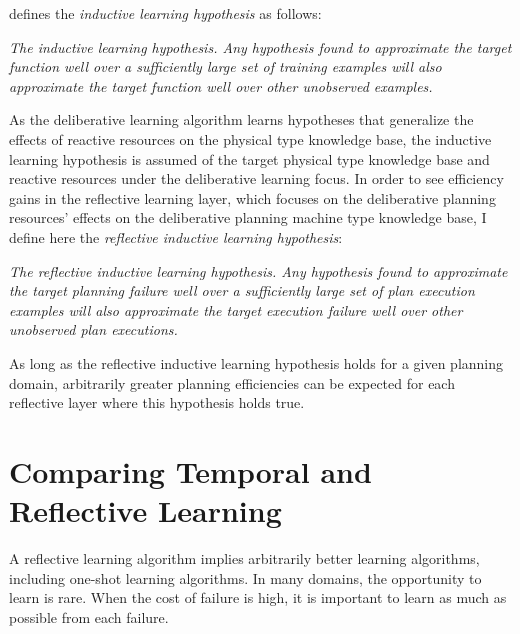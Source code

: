 \cite{mitchell:1997} defines the \emph{inductive learning hypothesis}
as follows:
\begin{definition}\emph{
\emph{The inductive learning hypothesis.} Any hypothesis found to
approximate the target function well over a sufficiently large set of
training examples will also approximate the target function well over
other unobserved examples.  }\end{definition} \noindent As the
deliberative learning algorithm learns hypotheses that generalize the
effects of reactive resources on the physical type knowledge base, the
inductive learning hypothesis is assumed of the target physical type
knowledge base and reactive resources under the deliberative learning
focus.  In order to see efficiency gains in the reflective learning
layer, which focuses on the deliberative planning resources' effects
on the deliberative planning machine type knowledge base, I define
here the \emph{reflective inductive learning hypothesis}:
\begin{definition}\emph{
\emph{The reflective inductive learning hypothesis.} Any hypothesis
found to approximate the target planning failure well over a
sufficiently large set of plan execution examples will also
approximate the target execution failure well over other unobserved
plan executions.}\end{definition} As long as the reflective inductive
learning hypothesis holds for a given planning domain, arbitrarily
greater planning efficiencies can be expected for each reflective
layer where this hypothesis holds true.

\section{Comparing Temporal and Reflective Learning}

A reflective learning algorithm implies arbitrarily better learning
algorithms, including one-shot learning algorithms.  In many domains,
the opportunity to learn is rare.  When the cost of failure is high,
it is important to learn as much as possible from each failure.

